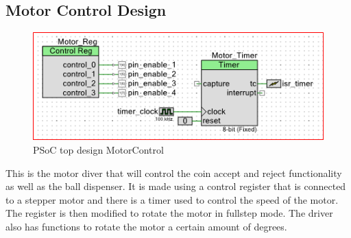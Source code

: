 \documentclass[Softwaredesign/Softwaredesign_main.tex]{subfiles}
\begin{document}
    \subsection{Motor Control Design}\label{subsec:motorControlDesign}
    \begin{figure}[H]
    \centering
    \includegraphics[width=\textwidth]{Softwaredesign/CoinSensor/graphics/TopDesign-MotorControl.png}
    \caption{PSoC top design MotorControl}
    \label{fig:MotorControl_PSoC_Design}
    \end{figure}
    This is the motor diver that will control the coin accept and reject functionality as well as the ball dispenser.
    It is made using a control register that is connected to a stepper motor and there is a timer used to control the speed of the motor.
    The register is then modified to rotate the motor in fullstep mode.
    The driver also has functions to rotate the motor a certain amount of degrees. 
\end{document}
